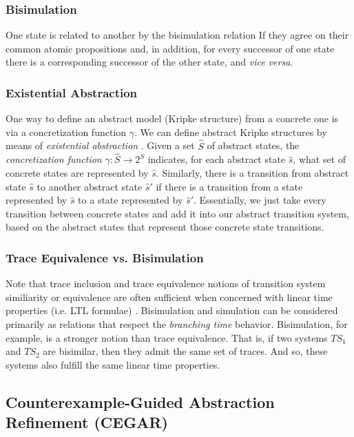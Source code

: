 \documentclass[10pt,a4paper]{article}
\begin{document}
\subsubsection*{Bisimulation}

One state is related to another by the bisimulation relation If they agree on their common atomic propositions and, in addition, for every successor of one state there is a corresponding successor of the other state, and \textit{vice versa}.

\subsubsection*{Existential Abstraction}

One way to define an abstract model (Kripke structure) from a concrete one is via a concretization function $\gamma$. We can define abstract Kripke structures by means of \textit{existential abstraction} \cite{94mcabs}. Given a set $\widehat{S}$ of abstract states, the \textit{concretization function} $\gamma : \widehat{S} \rightarrow 2^S$ indicates, for each abstract state $\widehat{s}$, what set of concrete states are represented by $\widehat{s}$. Similarly, there is a transition from abstract state $\widehat{s}$ to another abstract state $\widehat{s}'$ if there is a transition from a state represented by $\widehat{s}$ to a state represented by $\widehat{s}'$. Essentially, we just take every transition between concrete states and add it into our abstract transition system, based on the abstract states that represent those concrete state transitions.

\subsubsection*{Trace Equivalence vs. Bisimulation}

Note that trace inclusion and trace equivalence notions of transition system similiarity or equivalence are often sufficient when concerned with linear time properties (i.e. LTL formulae)  \cite{2008principlemc}. Bisimulation and simulation can be considered primarily as relations that respect the \textit{branching time} behavior. Bisimulation, for example, is a stronger notion than trace equivalence. That is, if two systems $TS_1$ and $TS_2$ are bisimilar, then they admit the same set of traces. And so, these systems also fulfill the same linear time properties. 

\subsection*{Counterexample-Guided Abstraction Refinement (CEGAR)}
\end{document}
